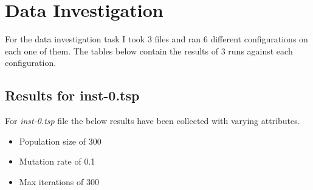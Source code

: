 \section{Data Investigation}

For the data investigation task I took 3 files and ran 6 different configurations on each one of them. The tables below contain the results of 3 runs against each configuration.

\subsection{Results for inst-0.tsp}
For \textit{inst-0.tsp} file the below results have been collected with varying attributes.

\begin{itemize}
  \item Population size of 300
  \item Mutation rate of 0.1
  \item Max iterations of 300
\end{itemize}

